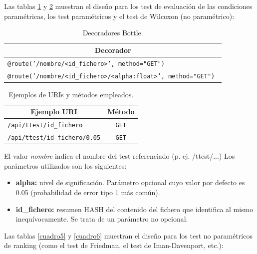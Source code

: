 Las tablas \ref{cuadro3} y \ref{cuadro4} muestran el diseño para los test de evaluación de las condiciones paramétricas, los test paramétricos y el test de Wilcoxon (no paramétrico):

\begin{table}[H]
	\centering
	\begin{tabular}{|l|}
		\hline
		\multicolumn{1}{|c|}{\textbf{Decorador}} \\ \hline
		\texttt{@route('/nombre/<id\_fichero>', method="GET")} \\ \hline
		\texttt{@route('/nombre/<id\_fichero>/<alpha:float>', method="GET") } \\ \hline
	\end{tabular}
	\caption{Decoradores Bottle.}
	\label{cuadro3}
\end{table}

\begin{table}[H]
	\centering
	\begin{tabular}{|l|c|}
		\hline
		\multicolumn{1}{|c|}{\textbf{Ejemplo URI}} & {\textbf{Método}} \\ \hline
		\texttt{/api/ttest/id\_fichero} & \texttt{GET} \\ \hline
		\texttt{/api/ttest/id\_fichero/0.05} & \texttt{GET} \\ \hline
	\end{tabular}
	\caption{Ejemplos de URIs y métodos empleados.}
	\label{cuadro4}
\end{table}

El valor \textit{nombre} indica el nombre del test referenciado (p. ej. /ttest/...) Los parámetros utilizados son los siguientes:
\begin{itemize}
\item \textbf{alpha:} nivel de significación. Parámetro opcional cuyo valor por defecto es 0.05 (probabilidad de error tipo 1 más común).
\item \textbf{id\_fichero:} resumen HASH del contenido del fichero que identifica al mismo inequívocamente. Se trata de un parámetro no opcional.
\end{itemize}

Las tablas \ref{cuadro5} y \ref{cuadro6} muestran el diseño para los test no paramétricos de ranking (como el test de Friedman, el test de Iman-Davenport, etc.):

